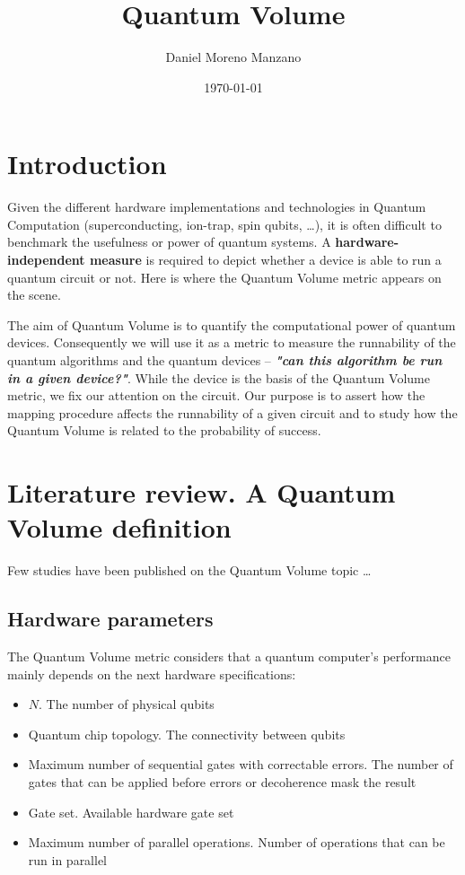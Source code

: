 \documentclass[11pt]{article}
\author{Daniel Moreno Manzano}
\date{\today}
\title{Quantum Volume}
\begin{document}
\maketitle


\section{Introduction}
\label{sec:org9afa232}

Given the different hardware implementations and technologies in Quantum Computation (superconducting, ion-trap, spin qubits, \ldots{}), it is often difficult to benchmark the usefulness or power of quantum systems. 
A \textbf{hardware-independent measure} is required to depict whether a device is able to run a quantum circuit or not.
Here is where the Quantum Volume metric appears on the scene.

The aim of Quantum Volume is to quantify the computational power of quantum devices. 
Consequently we will use it as a metric to measure the runnability of the quantum algorithms and the quantum devices -- \emph{\textbf{"can this algorithm be run in a given device?"}}.
While the device is the basis of the Quantum Volume metric, we fix our attention on the circuit.
Our purpose is to assert how the mapping procedure affects the runnability of a given circuit and to study how the Quantum Volume is related to the probability of success.

\section{Literature review. A Quantum Volume definition}
\label{sec:org3243182}

Few studies have been published on the Quantum Volume topic \cite{Bishop_2017,Moll_2018}\ldots{}

\subsection{Hardware parameters}
\label{sec:orgb6a26da}

The Quantum Volume metric considers that a quantum computer's performance mainly depends on the next hardware specifications:

\begin{itemize}
\item \(N\). The number of physical qubits
\item Quantum chip topology. The connectivity between qubits
\item Maximum number of sequential gates with correctable errors. The number of gates that can be applied before errors or decoherence mask the result
\item Gate set. Available hardware gate set
\item Maximum number of parallel operations. Number of operations that can be run in parallel
\end{itemize}
\end{document}
